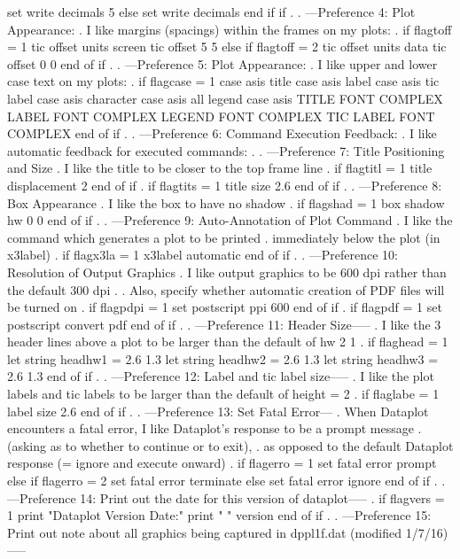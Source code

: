    set write decimals 5
else
   set write decimals
end if if
.
. ---Preference 4: Plot Appearance:
.    I like margins (spacings) within the frames on my plots:
.
if flagtoff = 1
   tic offset units screen
   tic offset 5 5
else if flagtoff = 2
   tic offset units data
   tic offset 0 0
end of if
.
. ---Preference 5: Plot Appearance:
.    I like upper and lower case text on my plots:
.
if flagcase = 1
   case asis
   title case asis
   label case asis
   tic label case asis
   character case asis all
   legend case asis
   TITLE FONT COMPLEX
   LABEL FONT COMPLEX
   LEGEND FONT COMPLEX
   TIC LABEL FONT COMPLEX
end of if
.
. ---Preference 6: Command Execution Feedback:
.    I like automatic feedback for executed commands:
.
. ---Preference 7: Title Positioning and Size
.    I like the title to be closer to the top frame line
.
if flagtitl = 1
   title displacement 2
end of if
.
if flagtits = 1
   title size 2.6
end of if
.
. ---Preference 8: Box Appearance
.    I like the box to have no shadow
.
if flagshad = 1
   box shadow hw 0 0
end of if
.
. ---Preference 9: Auto-Annotation of Plot Command
.    I like the command which generates a plot to be printed
.    immediately below the plot (in x3label)
.
if flagx3la = 1
   x3label automatic
end of if
.
. ---Preference 10: Resolution of Output Graphics
.    I like output graphics to be 600 dpi rather than the default 300 dpi
.
.    Also, specify whether automatic creation of PDF files will be turned on
.
if flagpdpi = 1
   set postscript ppi 600
end of if
.
if flagpdf = 1
   set postscript convert pdf
end of if
.
. ---Preference 11: Header Size-----
.    I like the 3 header lines above a plot to be larger than the default of     hw 2 1
.
if flaghead = 1
   let string headhw1 = 2.6 1.3
   let string headhw2 = 2.6 1.3
   let string headhw3 = 2.6 1.3
end of if
.
. ---Preference 12: Label and tic label size-----
.    I like the plot labels and tic labels to be larger than the default of    height = 2
.
if flaglabe = 1
   label size 2.6
end of if
.
. ---Preference 13: Set Fatal Error---
.    When Dataplot encounters a fatal error, I like Dataplot's response to be a prompt message
.    (asking as to whether to continue or to exit),
.    as opposed to the default Dataplot response (= ignore and execute onward)
.
if flagerro = 1
   set fatal error prompt
else if flagerro = 2
   set fatal error terminate
else
   set fatal error ignore
end of if
.
. ---Preference 14: Print out the date for this version of dataplot-----
.
if flagvers = 1
   print "Dataplot Version Date:"
   print " "
   version
end of if
.
. ---Preference 15: Print out note about all graphics being captured in dppl1f.dat (modified 1/7/16)-----
